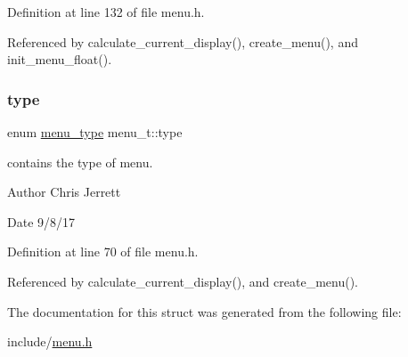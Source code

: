 Definition at line 132 of file menu.\+h.



Referenced by calculate\+\_\+current\+\_\+display(), create\+\_\+menu(), and init\+\_\+menu\+\_\+float().

\mbox{\label{structmenu__t_a110244ceb7d2a7cba95cfc5758d61c01}} 
\subsubsection{\texorpdfstring{type}{type}}
{\footnotesize\ttfamily enum \hyperlink{menu_8h_a6bbf4baf5018b0d76aab6c2e6bf85e62}{menu\+\_\+type} menu\+\_\+t\+::type}



contains the type of menu. 

\begin{DoxyAuthor}{Author}
Chris Jerrett 
\end{DoxyAuthor}
\begin{DoxyDate}{Date}
9/8/17 
\end{DoxyDate}


Definition at line 70 of file menu.\+h.



Referenced by calculate\+\_\+current\+\_\+display(), and create\+\_\+menu().



The documentation for this struct was generated from the following file\+:\begin{DoxyCompactItemize}
\item 
include/\hyperlink{menu_8h}{menu.\+h}\end{DoxyCompactItemize}
